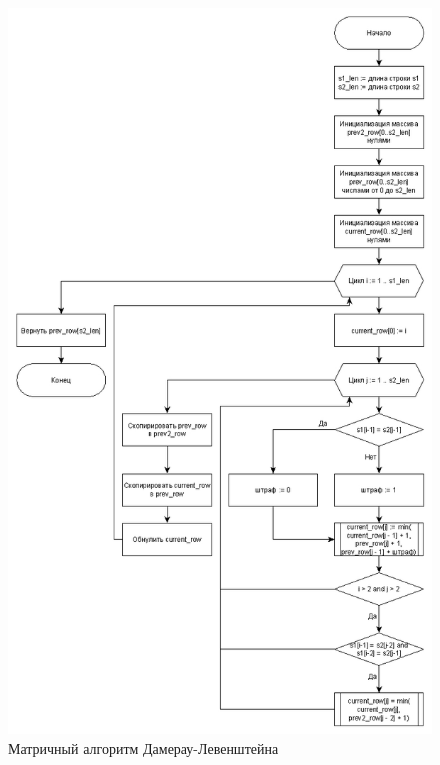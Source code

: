 \documentclass[14pt, a4paper]{report}
\begin{document}
	\begin{figure}[ht!]
		\centering
		\includegraphics[scale=0.5]{damleven}
		\caption{Матричный алгоритм Дамерау-Левенштейна}
		\label{fig:damleven}
	\end{figure}
\end{document}
